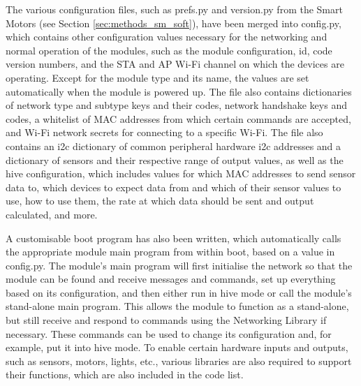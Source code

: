 The various configuration files, such as prefs.py and version.py from the Smart Motors (see Section \ref{sec:methods_sm_soft}), have been merged into config.py, which contains other configuration values necessary for the networking and normal operation of the modules, such as the module configuration, id, code version numbers, and the STA and AP Wi-Fi channel on which the devices are operating. Except for the module type and its name, the values are set automatically when the module is powered up.  The file also contains dictionaries of network type and subtype keys and their codes, network handshake keys and codes, a whitelist of MAC addresses from which certain commands are accepted, and Wi-Fi network secrets for connecting to a specific Wi-Fi. The file also contains an i2c dictionary of common peripheral hardware i2c addresses and a dictionary of sensors and their respective range of output values, as well as the hive configuration, which includes values for which MAC addresses to send sensor data to, which devices to expect data from and which of their sensor values to use, how to use them, the rate at which data should be sent and output calculated, and more.

A customisable boot program has also been written, which automatically calls the appropriate module main program from within boot, based on a value in config.py. The module's main program will first initialise the network so that the module can be found and receive messages and commands, set up everything based on its configuration, and then either run in hive mode or call the module's stand-alone main program. This allows the module to function as a stand-alone, but still receive and respond to commands using the Networking Library if necessary. These commands can be used to change its configuration and, for example, put it into hive mode. To enable certain hardware inputs and outputs, such as sensors, motors, lights, etc., various libraries are also required to support their functions, which are also included in the code list.

